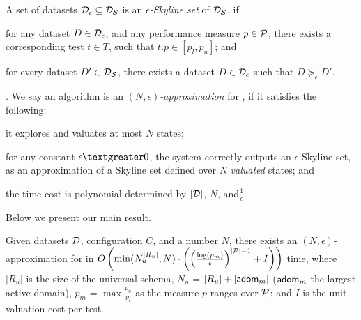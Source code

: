 \vspace{.5ex}
A set of datasets $\D_\epsilon\subseteq \D_\S$ 
is an {\em $\epsilon$-Skyline set} of 
$\D_\S$, if 
\tbi 
\item for any dataset $D\in \D_\epsilon$, 
and any performance measure $p\in\P$, 
there exists a corresponding 
test $t\in T$, such that 
$t.p\in [p_l, p_u]$; and 
\item 
for every dataset $D'\in \D_\S$, 
there exists a dataset 
$D\in \D_\epsilon$ such that 
$D \succeq_\epsilon D'$. 
\ei 


. We say an algorithm 
is an {\em $(N,\epsilon)$-approximation} for \modis, 
if it satisfies the following: 
\tbi 
\item it explores and valuates at most $N$ states; 
\item for any constant $\epsilon\textgreater 0$, the system correctly outputs an $\epsilon$-Skyline set, as an approximation of a Skyline set defined over $N$ {\em valuated} states; and 
\item the time cost is polynomial determined by $|\D|$, $N$, and$\frac{1}{\epsilon}$.
\ei

Below we present our 
main result. 

\begin{theorem}
\label{thm-fptas}
Given %
datasets $\D$, 
 configuration $C$, %
 and a number $N$, 
there exists an $(N,\epsilon)$-approximation for \modis in 
$O\left(\min(N_u^{|R_u|}, N)\cdot \left(\left(\frac{\log(p_m)}{\epsilon}\right)^{|\P|-1}+I\right)\right)$ time, where $|R_u|$ is the size of the universal 
schema, 
$N_u$ = $|R_u|+|\ad_m|$ 
($\ad_m$ the largest active domain), $p_m$ = 
$\max\frac{p_u}{p_l}$
as the measure $p$ ranges over $\P$; and $I$ is the 
unit valuation cost per test. 
\end{theorem}

